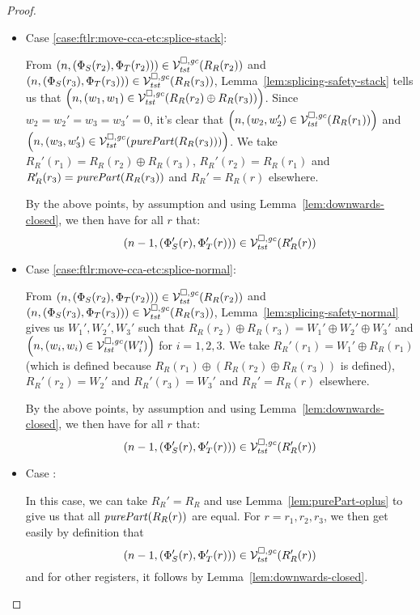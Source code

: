 \begin{proof}
\begin{itemize}
  \item Case \ref{case:ftlr:move-cca-etc:splice-stack}:

    From $\npair{(\Phi_S(r_2),\Phi_T(r_2))} \in \lrvg{\trust}(R_R(r_2))$ and $\npair{(\Phi_S(r_3),\Phi_T(r_3))} \in \lrvg{\trust}(R_R(r_3))$, Lemma~\ref{lem:splicing-safety-stack} tells us that $\npair{(w_1,w_1) \in \lrvg{\trust}(R_R(r_2)\oplus R_R(r_3))}$.
    Since $w_2 = w_2'=w_3=w_3'=0$, it's clear that 
    $\npair{(w_2,w_2') \in \lrvg{\trust}(R_R(r_1))}$ and $\npair{(w_3,w_3') \in \lrvg{\trust}(\purePart{R_R(r_3)})}$.
    We take $R_R'(r_1) = R_R(r_2)\oplus R_R(r_3)$, $R_R'(r_2) = R_R(r_1)$ and $R_R'(r_3) = \purePart{R_R(r_3)}$ and $R_R' = R_R(r)$ elsewhere.

    By the above points, by assumption and using Lemma~\ref{lem:downwards-closed}, we then have for all $r$ that:
    \[
      \npair[n-1]{(\Phi_S'(r), \Phi_T'(r))} \in \lrvg{\trust}(R_R'(r))
    \]

  \item Case \ref{case:ftlr:move-cca-etc:splice-normal}:

    From $\npair{(\Phi_S(r_2),\Phi_T(r_2))} \in \lrvg{\trust}(R_R(r_2))$ and $\npair{(\Phi_S(r_3),\Phi_T(r_3))} \in \lrvg{\trust}(R_R(r_3))$, Lemma~\ref{lem:splicing-safety-normal} gives us $W_1',W_2',W_3'$ such that $R_R(r_2)\oplus R_R(r_3) = W_1'\oplus W_2' \oplus W_3'$ and
    $\npair{(w_i,w_i) \in \lrvg{\trust}(W_i')}$ for $i = 1,2,3$.
    We take $R_R'(r_1) = W_1'\oplus R_R(r_1)$ (which is defined because $R_R(r_1) \oplus (R_R(r_2)\oplus R_R(r_3))$ is defined), $R_R'(r_2) = W_2'$ and $R_R'(r_3) = W_3'$ and $R_R' = R_R(r)$ elsewhere.

    By the above points, by assumption and using Lemma~\ref{lem:downwards-closed}, we then have for all $r$ that:
    \[
      \npair[n-1]{(\Phi_S'(r), \Phi_T'(r))} \in \lrvg{\trust}(R_R'(r))
    \]

  \item Case \label{case:ftlr:move-cca-etc:splice-seal}:

    In this case, we can take $R_R' = R_R$ and use Lemma~\ref{lem:purePart-oplus} to give us that all $\purePart{R_R(r)}$ are equal.
    For $r = r_1, r_2, r_3$, we then get easily by definition that
    \[
      \npair[n-1]{(\Phi_S'(r), \Phi_T'(r))} \in \lrvg{\trust}(R_R'(r))
    \]
    and for other registers, it follows by Lemma~\ref{lem:downwards-closed}.
  \end{itemize}



\end{proof}
